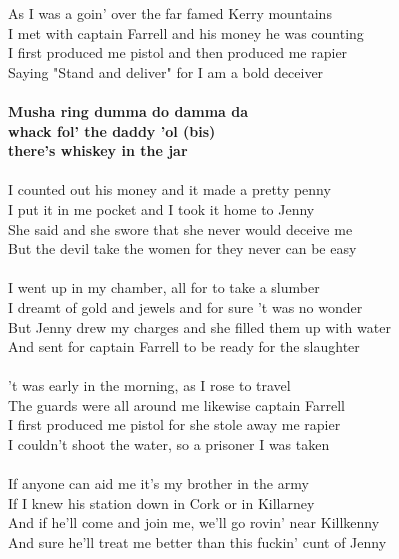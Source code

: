 As I was a goin' over the far famed Kerry mountains\\
I met with captain Farrell and his money he was counting\\
I first produced me pistol and then produced me rapier\\
Saying "Stand and deliver" for I am a bold deceiver\\
~\\
\textbf{Musha ring dumma do damma da\\
whack fol' the daddy 'ol (bis)\\
there's whiskey in the jar}\\
~\\
I counted out his money and it made a pretty penny \\
I put it in me pocket and I took it home to Jenny\\
She said and she swore that she never would deceive me\\
But the devil take the women for they never can be easy\\
~\\
I went up in my chamber, all for to take a slumber\\
I dreamt of gold and jewels and for sure 't was no wonder\\
But Jenny drew my charges and she filled them up with water\\
And sent for captain Farrell to be ready for the slaughter\\
~\\
't was early in the morning, as I rose to travel\\
The guards were all around me likewise captain Farrell\\
I first produced me pistol for she stole away me rapier\\
I couldn't shoot the water, so a prisoner I was taken\\
~\\
If anyone can aid me it's my brother in the army\\
If I knew his station down in Cork or in Killarney\\
And if he'll come and join me, we'll go rovin' near Killkenny\\
And sure he'll treat me better than this fuckin' cunt of Jenny\\
